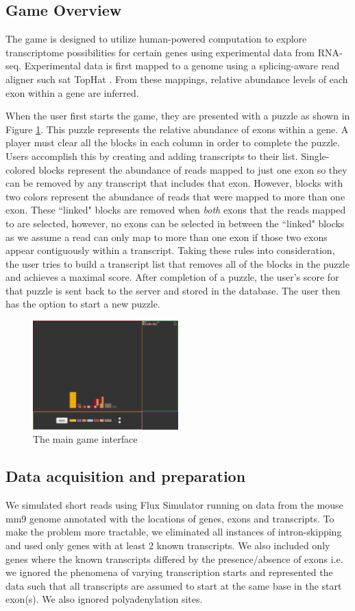 \documentclass[12pt]{article}
\begin{document}
\subsection*{Game Overview}
The game is designed to utilize human-powered computation to explore transcriptome possibilities for certain genes using experimental data from
RNA-seq. Experimental data is first mapped to a genome using a splicing-aware read aligner such sat TopHat \citep{trapnell2009tophat}. From these mappings,
relative abundance levels of each exon within a gene are inferred.

When the user first starts the game, they are presented with a puzzle as shown in Figure \ref{fig:gamescreen}. This puzzle represents
the relative abundance of exons within a gene. A player must clear all the blocks in each column in order to complete the puzzle. Users accomplish this by 
creating and adding transcripts to their list. Single-colored blocks represent the abundance of reads mapped to just one exon so they can be removed by any 
transcript that includes that exon. However, blocks with two colors represent the abundance of reads that were mapped to more than one exon. These ``linked"
blocks are removed when \emph{both} exons that the reads mapped to are selected, however, no exons can be selected in between the ``linked" blocks as
we assume a read can only map to more than one exon if those two exons appear contiguously within a transcript. Taking these rules into consideration, the user
tries to build a transcript list that removes all of the blocks in the puzzle and achieves a maximal score. After completion of a puzzle, the user's score for that puzzle is
sent back to the server and stored in the database. The user then has the option to start a new puzzle.
\begin{figure}[t]
\centering
\includegraphics[width=0.5\textwidth]{gamescreen}
\caption{The main game interface}
\label{fig:gamescreen}
\end{figure}
\subsection*{Data acquisition and preparation}
We simulated short reads using Flux Simulator \citep{sammeth2010flux} running on data from the mouse mm9 genome annotated with the locations of genes, exons and transcripts. To make the problem more tractable, we eliminated all instances of intron-skipping and used only genes with at least 2 known transcripts. We also included only genes where the known transcripts differed by the presence/absence of exons i.e. we ignored the phenomena of varying transcription starts and represented the data such that all transcripts are assumed to start at the same base in the start exon(s). We also ignored polyadenylation sites. 
\end{document}
